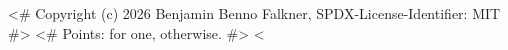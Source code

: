<# Copyright (c) 2026 Benjamin Benno Falkner, SPDX-License-Identifier: MIT #>
<# Points: \pp for one, \pp[n] otherwise. #>
<%
